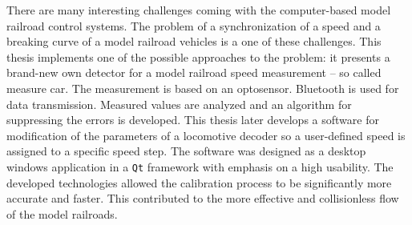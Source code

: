 There are many interesting challenges coming with the computer-based model
railroad control systems. The problem of a synchronization of a speed and a
breaking curve of a model railroad vehicles is a one of these challenges.
This thesis implements one of the possible approaches to the problem: it
presents a brand-new own detector for a model railroad speed measurement -- so
called measure car. The measurement is based on an optosensor. Bluetooth is
used for data transmission. Measured values are analyzed and an algorithm for
suppressing the errors is developed. This thesis later develops a software for
modification of the parameters of a locomotive decoder so a user-defined speed
is assigned to a specific speed step. The software was designed as a desktop
windows application in a \texttt{Qt} framework with emphasis on a high
usability. The developed technologies allowed the calibration process to be
significantly more accurate and faster. This contributed to the more effective
and collisionless flow of the model railroads.
